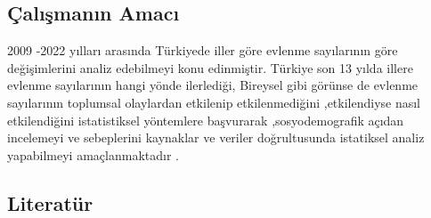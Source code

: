 \documentclass[
  12pt,
]{article}
\begin{document}
\hypertarget{uxe7alux131ux15fmanux131n-amacux131}{%
\subsection{Çalışmanın Amacı}\label{uxe7alux131ux15fmanux131n-amacux131}}

2009 -2022 yılları arasında Türkiyede iller göre evlenme sayılarının göre değişimlerini analiz edebilmeyi konu edinmiştir.
Türkiye son 13 yılda illere evlenme sayılarının hangi yönde ilerlediği, Bireysel gibi görünse de evlenme sayılarının toplumsal olaylardan etkilenip etkilenmediğini ,etkilendiyse nasıl etkilendiğini istatistiksel yöntemlere başvurarak ,sosyodemografik açıdan incelemeyi ve sebeplerini kaynaklar ve veriler doğrultusunda istatiksel analiz yapabilmeyi amaçlanmaktadır .

\hypertarget{literatuxfcr}{%
\subsection{Literatür}\label{literatuxfcr}}
\end{document}
